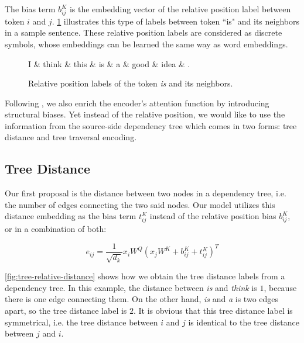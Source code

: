The bias term $b^K_{ij}$ is the embedding vector of the relative position label between token $i$ and $j$. \cref{fig:relative-position-label} illustrates this type of labels between token ``is" and its neighbors in a sample sentence.
These relative position labels are considered as discrete symbols, whose embeddings can be learned the same way as word embeddings.

\begin{figure}[t]
    \centering
    \begin{dependency}
        \begin{deptext}
        I \& think \& this \& is \& a \& good \& idea \& . \\
        \end{deptext}
    \end{dependency}
    \caption{Relative position labels of the token \textit{is} and its neighbors.}
    \label{fig:relative-position-label}
\end{figure}

Following \citeauthor{DBLP:conf/naacl/ShawUV18}, we also enrich the encoder's attention function by introducing structural biases. Yet instead of the relative position, we would like to use the information from the source-side dependency tree which comes in two forms: tree distance and tree traversal encoding.

\subsection{Tree Distance}
\label{enriching-structure-treedist}

Our first proposal is the distance between two nodes in a dependency tree, i.e. the number of edges connecting the two said nodes. Our model \TreeDistance utilizes this distance embedding as the bias term $t_{ij}^K$ instead of the relative position bias $b^K_{ij}$, or in a combination of both:

\[ e_{ij}=\frac{1}{\sqrt{d_k}} x_i W^Q (x_j W^K + b^K_{ij} + t_{ij}^K)^T \]

\cref{fig:tree-relative-distance} shows how we obtain the tree distance labels from a dependency tree.
In this example, the distance between \textit{is} and \textit{think} is $1$, because there is one edge connecting them.
On the other hand, \textit{is} and \textit{a} is two edges apart, so the tree distance label is $2$.
It is obvious that this tree distance label is symmetrical, i.e. the tree distance between $i$ and $j$ is identical to the tree distance between $j$ and $i$.

